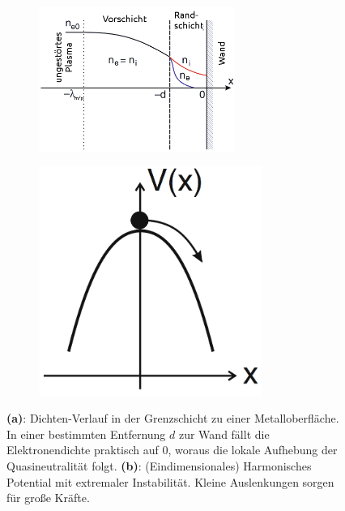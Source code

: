 \documentclass[numbers=noenddot,a4paper]{scrartcl}
\newcommand{\fett}[1]{\textbf{#1}}
\begin{document}
				\begin{figure}
					\centering
					\begin{subfigure}[b]{0.6\textwidth}
						\centering
						\includegraphics[width=0.7\textwidth,height=0.5\textwidth]{figs/randschichtpiel.png}
						\caption{}
						\label{img:dichterand}
					\end{subfigure}
					\begin{subfigure}[b]{0.375\textwidth}
						\centering
						\includegraphics[width=0.8\textwidth,height=0.8\textwidth]{figs/parabelpiel.png}
						\caption{}
						\label{img:parab}
					\end{subfigure}
					\caption{\fett{(a)}: Dichten-Verlauf in der Grenzschicht zu einer Metalloberfläche. In einer bestimmten Entfernung $d$ zur Wand fällt die Elektronendichte praktisch auf 0, woraus die lokale Aufhebung der Quasineutralität folgt. \fett{(b)}: (Eindimensionales) Harmonisches Potential mit extremaler Instabilität. Kleine Auslenkungen sorgen für große Kräfte.}
				\end{figure}
			
\end{document}
